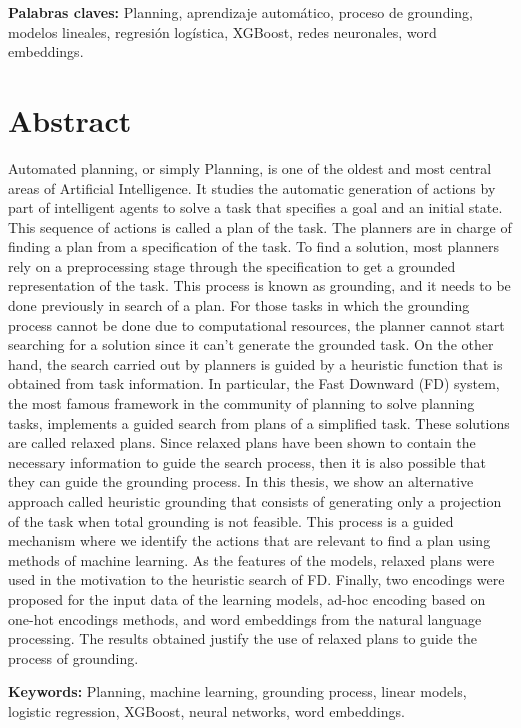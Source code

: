 \noindent %
\textbf{Palabras claves:} Planning, aprendizaje automático, proceso de
grounding, modelos lineales, regresión logística, XGBoost, redes neuronales,
word embeddings.

\section*{Abstract}

Automated planning, or simply Planning, is one of the oldest and most central
areas of Artificial Intelligence.  It studies the automatic generation of
actions by part of intelligent agents to solve a task that specifies a goal and
an initial state. This sequence of actions is called a plan of the task. The
planners are in charge of finding a plan from a specification of the task. To
find a solution, most planners rely on a  preprocessing stage through the
specification to get a grounded representation of the task. This process is
known as grounding, and it needs to be done previously in search of a plan. For
those tasks in which the grounding process cannot be done due to computational
resources, the planner cannot start searching for a solution since it can't
generate the grounded task. On the other hand, the search carried out by
planners is guided by a heuristic function that is obtained from task
information. In particular, the Fast Downward (FD) system, the most famous
framework in the community of planning to solve planning tasks, implements
a guided search from plans of a simplified task. These solutions are called
relaxed plans. Since relaxed plans have been shown to contain the necessary
information to guide the search process, then it is also possible that they can
guide the grounding process. In this thesis, we show an alternative approach
called heuristic grounding that consists of generating only a projection of the
task when total grounding is not feasible. This process is a guided mechanism
where we identify the actions that are relevant to find a plan using methods of
machine learning. As the features of the models, relaxed plans were used in the
motivation to the heuristic search of FD. Finally, two encodings were proposed
for the input data of the learning models, ad-hoc encoding based on one-hot
encodings methods, and word embeddings from the natural language processing. The
results obtained justify the use of relaxed plans to guide the process of
grounding.

\textbf{Keywords:} Planning, machine learning, grounding process, linear models, logistic
regression, XGBoost, neural networks, word embeddings.